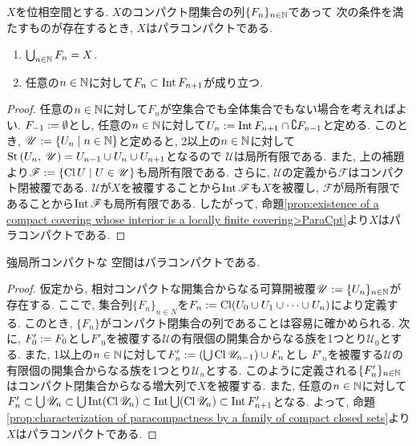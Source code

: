 \documentclass[uplatex, dvipdfmx, a4paper, 12pt, class=jsbook, crop=false]{standalone}
\begin{document}
\begin{proposition}
	\label{prop:characterization of paracompactness by a family of compact closed sets}
	$ X $を位相空間とする. $ X $のコンパクト閉集合の列$ \{F_n\}_{n \in \mathbb{N}} $であって
	次の条件を満たすものが存在するとき, $ X $はパラコンパクトである.
	\begin{enumerate}
		\item $ \bigcup_{n \in \mathbb{N}} F_n = X $.
		\item 任意の$ n \in \mathbb{N} $に対して$ F_n \subset \mathop{\mathrm{Int}}\nolimits F_{n+1} $が成り立つ.
	\end{enumerate}
\end{proposition}

\begin{proof}
	任意の$ n \in \mathbb{N} $に対して$ F_n $が空集合でも全体集合でもない場合を考えればよい. 
	$ F_{-1} \mathrel{:=} \emptyset $とし, 任意の$ n \in \mathbb{N} $に対して$ U_n \mathrel{:=} \mathop{\mathrm{Int}}\nolimits F_{n+1} \cap \complement F_{n-1} $と定める. 
	このとき, $ \mathscr{U} \defeq \setcomp{U_n}{n \in \N} $と定めると, 
	2以上の$ n \in \mathbb{N} $に対して$ \mathrm{St}\left(U_n , \: \mathscr{U}\right) = U_{n-1} \cup U_n \cup U_{n+1} $となるので
	$ \mathscr{U} $は局所有限である. また, 上の補題より$ \mathscr{F} \defeq \setcomp{\topcl U}{U \in \mathscr{U}} $も局所有限である. 
	さらに, $ \mathscr{U} $の定義から$ \mathscr{F} $はコンパクト閉被覆である. 
	$ \mathscr{U} $が$ X $を被覆することから$ \mathop{\mathrm{Int}}\nolimits \mathscr{F} $も$ X $を被覆し, 
	$ \mathscr{F} $が局所有限であることから$ \mathop{\mathrm{Int}}\nolimits \mathscr{F} $も局所有限である. 
	したがって, 命題\ref{prop:existence of a compact covering whose interior is a locally finite covering>ParaCpt}より$ X $はパラコンパクトである.
\end{proof}

\begin{proposition}
	強局所コンパクトな \Lindelof 空間はパラコンパクトである.
\end{proposition}

\begin{proof}
	仮定から, 相対コンパクトな開集合からなる可算開被覆$ \mathscr{U} \mathrel{:=} \{U_n\}_{n \in \mathbb{N}} $が存在する. 
	ここで, 集合列$ \{F_n\}_{n \in N} $を$ F_n \mathrel{:=} \mathop{\mathrm{Cl}}\nolimits (U_0 \cup U_1 \cup \cdots \cup U_n) $により定義する. 
	このとき, $ \{F_n\} $がコンパクト閉集合の列であることは容易に確かめられる. 
	次に, $ F'_0 \mathrel{:=} F_0 $とし$ F'_0 $を被覆する$ \mathscr{U} $の有限個の開集合からなる族を1つとり$ \mathscr{U}_0 $とする. 
	また, 1以上の$ n \in \mathbb{N} $に対して$ F'_n \mathrel{:=} \left(\bigcup \mathop{\mathrm{Cl}}\nolimits \mathscr{U}_{n-1} \right) \cup F_n $とし
	$ F'_n $を被覆する$ \mathscr{U} $の有限個の開集合からなる族を1つとり$ \mathscr{U}_n $とする. 
	このように定義される$ \{F'_n\}_{n \in \mathbb{N}} $はコンパクト閉集合からなる増大列で$ X $を被覆する. 
	また, 任意の$ n \in \mathbb{N} $に対して$ F'_n \subset \bigcup \mathscr{U}_n  \subset \bigcup \mathop{\mathrm{Int}}\nolimits (\mathop{\mathrm{Cl}}\nolimits \mathscr{U}_n) 
	\subset \mathop{\mathrm{Int}}\nolimits \bigcup (\mathop{\mathrm{Cl}}\nolimits \mathscr{U}_n) \subset \mathop{\mathrm{Int}}\nolimits F'_{n+1} $となる. 
	よって, 命題\ref{prop:characterization of paracompactness by a family of compact closed sets}より$ X $はパラコンパクトである.
\end{proof}
\end{document}
